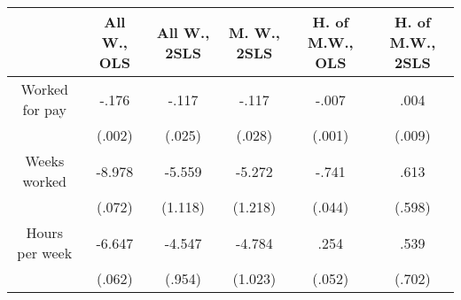 \begin{tabular}{c | c c c c c}
\hline
& All W., OLS & All W., 2SLS & M. W., 2SLS & H. of M.W., OLS & H. of M.W., 2SLS \\
\hline
Worked for pay & -.176 & -.117 & -.117 & -.007 & .004 \\
 & (.002) & (.025) & (.028) & (.001) & (.009)\\
Weeks worked & -8.978 & -5.559 & -5.272 & -.741 & .613 \\
 & (.072) & (1.118) & (1.218) & (.044) & (.598) \\
Hours per week & -6.647 & -4.547 & -4.784 & .254 & .539 \\
 & (.062) & (.954) & (1.023) & (.052) & (.702)
\end{tabular}